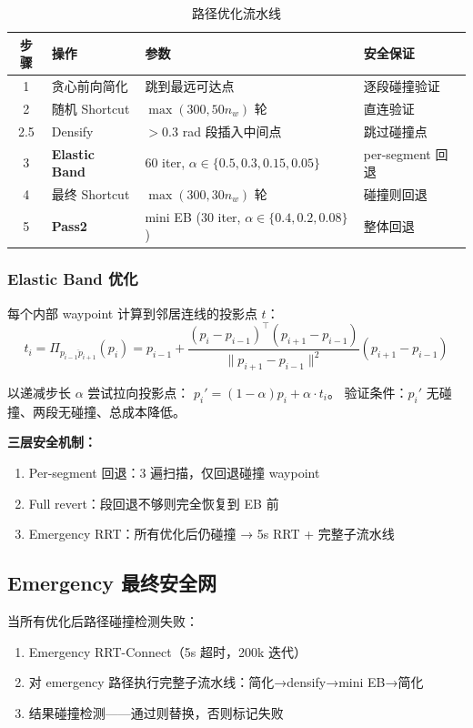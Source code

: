 \documentclass[11pt,a4paper]{article}
\begin{document}
\begin{table}[ht]
\centering
\caption{路径优化流水线}
\label{tab:pipeline}
\begin{tabular}{@{}clll@{}}
\toprule
\textbf{步骤} & \textbf{操作} & \textbf{参数} & \textbf{安全保证} \\
\midrule
1 & 贪心前向简化 & 跳到最远可达点 & 逐段碰撞验证 \\
2 & 随机 Shortcut & $\max(300, 50 n_w)$ 轮 & 直连验证 \\
2.5 & Densify & $> 0.3$ rad 段插入中间点 & 跳过碰撞点 \\
3 & \textbf{Elastic Band} & 60 iter, $\alpha \in \{0.5, 0.3, 0.15, 0.05\}$ & per-segment 回退 \\
4 & 最终 Shortcut & $\max(300, 30 n_w)$ 轮 & 碰撞则回退 \\
5 & \textbf{Pass2} & mini EB (30 iter, $\alpha \in \{0.4, 0.2, 0.08\}$) & 整体回退 \\
\bottomrule
\end{tabular}
\end{table}

\subsubsection{Elastic Band 优化}

每个内部 waypoint 计算到邻居连线的投影点 $t$：
\begin{equation}
t_i = \Pi_{\overline{p_{i-1}p_{i+1}}}(p_i) = p_{i-1} + \frac{(p_i - p_{i-1})^\top (p_{i+1} - p_{i-1})}{\|p_{i+1} - p_{i-1}\|^2} (p_{i+1} - p_{i-1})
\end{equation}

以递减步长 $\alpha$ 尝试拉向投影点：
$p_i' = (1-\alpha) p_i + \alpha \cdot t_i$。
验证条件：$p_i'$ 无碰撞、两段无碰撞、总成本降低。

\textbf{三层安全机制：}
\begin{enumerate}[nosep]
  \item Per-segment 回退：3 遍扫描，仅回退碰撞 waypoint
  \item Full revert：段回退不够则完全恢复到 EB 前
  \item Emergency RRT：所有优化后仍碰撞 → 5s RRT + 完整子流水线
\end{enumerate}

\subsection{Emergency 最终安全网}

当所有优化后路径碰撞检测失败：
\begin{enumerate}[nosep]
  \item Emergency RRT-Connect（5s 超时，200k 迭代）
  \item 对 emergency 路径执行完整子流水线：简化→densify→mini EB→简化
  \item 结果碰撞检测——通过则替换，否则标记失败
\end{enumerate}
\end{document}
